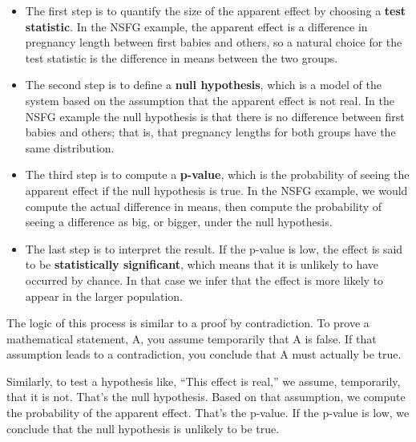 \documentclass[12pt]{book}
\theoremstyle{exercise}
\begin{document}
\begin{itemize}

\item The first step is to quantify the size of the apparent effect by
  choosing a {\bf test statistic}.  In the NSFG example, the apparent
  effect is a difference in pregnancy length between first babies and
  others, so a natural choice for the test statistic is the difference
  in means between the two groups.%

\item The second step is to define a {\bf null hypothesis}, which is a
  model of the system based on the assumption that the apparent effect
  is not real.  In the NSFG example the null hypothesis is that there
  is no difference between first babies and others; that is, that
  pregnancy lengths for both groups have the same distribution.%
%
%

\item The third step is to compute a {\bf p-value}, which is the
  probability of seeing the apparent effect if the null hypothesis is
  true.  In the NSFG example, we would compute the actual difference
  in means, then compute the probability of seeing a
  difference as big, or bigger, under the null hypothesis.%

\item The last step is to interpret the result.  If the p-value is
  low, the effect is said to be {\bf statistically significant}, which
  means that it is unlikely to have occurred by chance.  In that case
  we infer that the effect is more likely to appear in the larger
  population.%
%

\end{itemize}

The logic of this process is similar to a proof by
contradiction.  To prove a mathematical statement, A, you assume
temporarily that A is false.  If that assumption leads to a
contradiction, you conclude that A must actually be true.%
%

Similarly, to test a hypothesis like, ``This effect is real,'' we
assume, temporarily, that it is not.  That's the null hypothesis.
Based on that assumption, we compute the probability of the apparent
effect.  That's the p-value.  If the p-value is low, we
conclude that the null hypothesis is unlikely to be true.%
%
\end{document}
